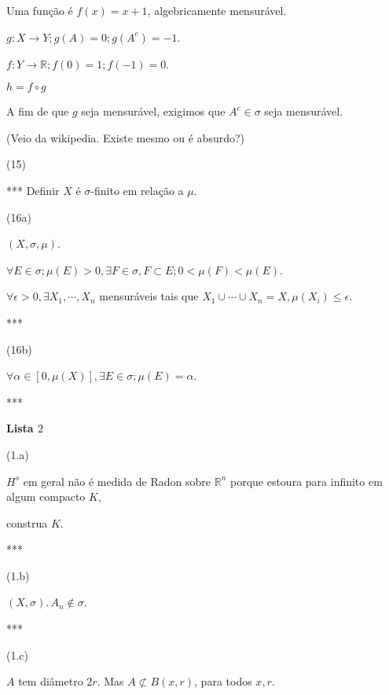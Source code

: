 \documentclass[12pt]{article}
\begin{document}
Uma fun\c{c}\~ao \'e $f(x) = x + 1$, algebricamente mensur\'avel.

$g : X \to Y ; g(A) = 0 ; g(A^c) = -1$.

$f : Y \to \mathbb{R} ; f(0) = 1 ; f(-1) = 0$.

$h = f \circ g$

A fim de que $g$ seja mensur\'avel, exigimos que $A^c \in \sigma$ seja mensur\'avel.

(Veio da wikipedia. Existe mesmo ou \'e absurdo?)

\vspace{3mm}

(15)

*** Definir $X$ \'e $\sigma$-finito em rela\c{c}\~ao a $\mu$.

\vspace{3mm}

(16a)

$(X, \sigma, \mu)$.

$\forall E \in \sigma ; \mu(E) > 0, \exists F \in \sigma, F \subset E ; 0 < \mu(F) < \mu(E)$.

$\forall \epsilon > 0, \exists X_1, \cdots, X_n $ mensur\'aveis tais que $X_1 \cup \cdots \cup X_n = X, \mu(X_i) \le \epsilon$.

***

\vspace{3mm}

(16b)

$\forall \alpha \in [0, \mu(X)], \exists E \in \sigma ; \mu(E) = \alpha$.

***

\vspace{3mm}

\textbf{Lista $2$}

\vspace{3mm}

(1.a)

$H^s$ em geral n\~ao \'e medida de Radon sobre $\mathbb{R}^n$ porque estoura para infinito em algum compacto $K$,

construa $K$.

***

\vspace{3mm}

(1.b)

$(X, \sigma).\,A_n \notin \sigma$.

***

\vspace{3mm}

(1.c)

$A$ tem di\^ametro $2r$. Mas $A \not\subset B(x, r)$, para todos $x, r$.
\end{document}
